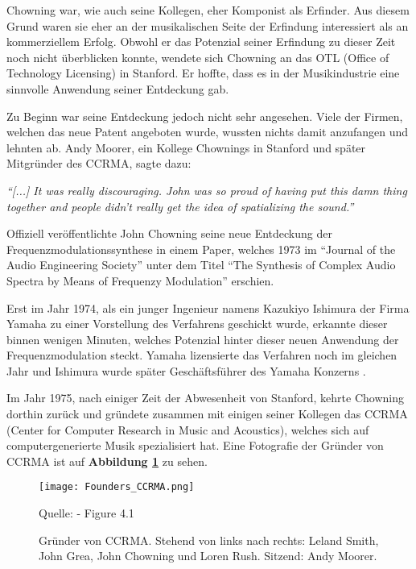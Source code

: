 Chowning war, wie auch seine Kollegen, eher Komponist als Erfinder. Aus diesem Grund waren sie eher an der musikalischen Seite der Erfindung interessiert als an kommerziellem Erfolg. Obwohl er das Potenzial seiner Erfindung zu dieser Zeit noch nicht überblicken konnte, wendete sich Chowning an das OTL (Office of Technology Licensing) in Stanford. Er hoffte, dass es in der Musikindustrie eine sinnvolle Anwendung seiner Entdeckung gab.\cite[S. 42]{soundofinnovation}

 Zu Beginn war seine Entdeckung jedoch nicht sehr angesehen. Viele der Firmen, welchen das neue Patent angeboten wurde, wussten nichts damit anzufangen und lehnten ab. Andy Moorer, ein Kollege Chownings in Stanford und später Mitgründer des CCRMA, sagte dazu: 

\textit{``[...] It was really discouraging. John was so proud of having put this damn thing together and people didn't really get the idea of spatializing the sound.''}\cite[S. 43]{soundofinnovation}

Offiziell veröffentlichte John Chowning seine neue Entdeckung der Frequenzmodulationssynthese in einem Paper, welches 1973 im ``Journal of the Audio Engineering Society'' unter dem Titel ``The Synthesis of Complex Audio Spectra by Means of Frequenzy Modulation'' erschien.

Erst im Jahr 1974, als ein junger Ingenieur namens Kazukiyo Ishimura der Firma Yamaha zu einer Vorstellung des Verfahrens geschickt wurde, erkannte dieser binnen wenigen Minuten, welches Potenzial hinter dieser neuen Anwendung der Frequenzmodulation steckt. Yamaha lizensierte das Verfahren noch im gleichen Jahr und Ishimura wurde später Geschäftsführer des Yamaha Konzerns \cite{fatherofdigitalmusik}.

Im Jahr 1975, nach einiger Zeit der Abwesenheit von Stanford, kehrte Chowning dorthin zurück und gründete zusammen mit einigen seiner Kollegen das CCRMA (Center for Computer Research in Music and Acoustics), welches sich auf computergenerierte Musik spezialisiert hat.
Eine Fotografie der Gründer von CCRMA ist auf \textbf{Abbildung \ref{fig:foundersCCRMA}} zu sehen.

\begin{figure} [ht]
\centering
  \texttt{[image: Founders\_CCRMA.png]}
\caption{Gründer von CCRMA. Stehend von links nach rechts: Leland Smith, John Grea, John Chowning und Loren Rush. Sitzend: Andy Moorer.}
\label{fig:foundersCCRMA}
Quelle: \cite[S. 52]{soundofinnovation} - Figure 4.1
\end{figure}

